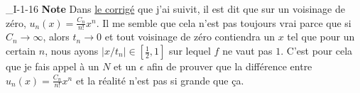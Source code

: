 \begin{corrige}{_I-1-16}
{\bf Note} Dans \href{http://www.bibmath.net/exercices/bde/analyse/distrib/testcor.pdf}{le corrigé} que j'ai suivit, il est dit que sur un voisinage de zéro, $u_n(x)=\frac{ C_n }{ n! }x^n$. Il me semble que cela n'est pas toujours vrai parce que si $C_n\to\infty$, alors $t_n\to 0$ et tout voisinage de zéro contiendra un $x$ tel que pour un certain $n$, nous ayons $|x/t_n|\in [\frac{ 1 }{2},1]$ sur lequel $f$ ne vaut pas $1$. C'est pour cela que je fais appel à un $N$ et un $\epsilon$ afin de prouver que la différence entre $u_n(x)=\frac{ C_n }{ n! }x^n$ et la réalité n'est pas si grande que ça.

\end{corrige}
